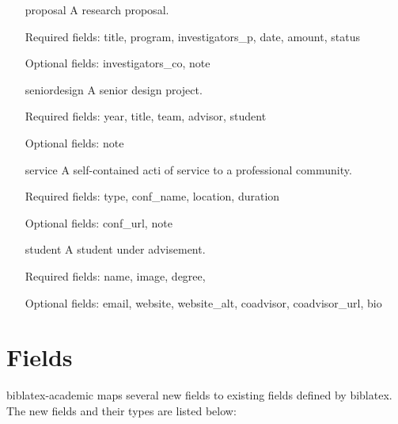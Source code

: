 \documentclass[11pt,letterpaper]{article}
\newcommand{\pkg}[1]{\textsf{#1}}
\newcommand{\entry}[1]{\textsf{#1}}
\newcommand{\field}[1]{\textsf{#1}}
\begin{document}
\begin{itemize}
  \item[\entry{proposal}] A research proposal.
    
    Required fields:
    \field{title},
    \field{program},
    \field{investigators\_p},
    \field{date},
    \field{amount},
    \field{status}

    Optional fields:
    \field{investigators\_co},
    \field{note}

  \item[\entry{seniordesign}] A senior design project.
    
    Required fields:
    \field{year},
    \field{title},
    \field{team},
    \field{advisor},
    \field{student}

    Optional fields:
    \field{note}

  \item[\entry{service}] A self-contained acti of service to a professional community.

    Required fields:
    \field{type},
    \field{conf\_name},
    \field{location},
    \field{duration}

    Optional fields:
    \field{conf\_url},
    \field{note}

  \item[\entry{student}] A student under advisement.
 
    Required fields:
    \field{name},
    \field{image},
    \field{degree},

    Optional fields:
    \field{email},
    \field{website},
    \field{website\_alt},
    \field{coadvisor},
    \field{coadvisor\_url},
    \field{bio}
\end{itemize}


\section{Fields}\label{sec:fields}

\pkg{biblatex-academic} maps several new fields to existing fields defined by \pkg{biblatex}.
The new fields and their types are listed below:
\end{document}
